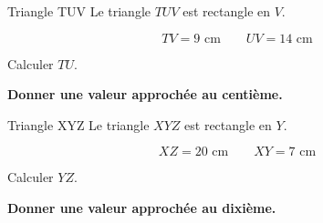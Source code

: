 \documentclass[11pt,a4paper]{article}
\begin{document}
\vspace{3mm}


\noindent
\begin{minipage}[t]{0.485\linewidth}

\begin{exercicebox}{Triangle TUV}
Le triangle \(TUV\) est rectangle en \(V\).

\[
TV=9\text{ cm}
\qquad
UV=14\text{ cm}
\]

Calculer \(TU\).

\textbf{Donner une valeur approchée au centième.}
\end{exercicebox}

\end{minipage}
\hfill
\begin{minipage}[t]{0.485\linewidth}

\begin{exercicebox}{Triangle XYZ}
Le triangle \(XYZ\) est rectangle en \(Y\).

\[
XZ=20\text{ cm}
\qquad
XY=7\text{ cm}
\]

Calculer \(YZ\).

\textbf{Donner une valeur approchée au dixième.}
\end{exercicebox}

\end{minipage}
\end{document}

